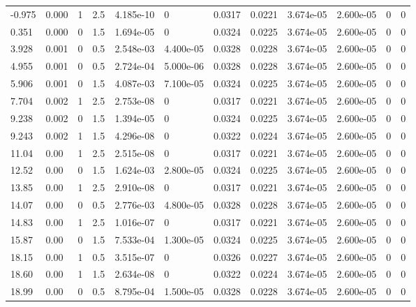 \documentclass[preview]{standalone}
\begin{document}
{{\begin{tabular}{L{1.2cm}C{1.2cm} C{0.3cm}C{0.5cm} C{1.4cm}C{1.4cm} C{1.4cm}C{1.4cm} C{1.6cm}C{1.6cm} C{1.6cm}C{1.6cm}}
  -0.975  &  0.000  & 1     & 2.5 &  4.185e-10  & 0  &  0.0317&   0.0221& 3.674e-05 & 2.600e-05   &  0 & 0  \\ 
  0.351  &  0.000  & 0     & 1.5 &  1.694e-05  & 0  &  0.0324&   0.0225& 3.674e-05 & 2.600e-05   &  0 & 0  \\ 
  3.928  &  0.001  & 0     & 0.5 &  2.548e-03  & 4.400e-05  &  0.0328&   0.0228& 3.674e-05 & 2.600e-05   &  0 & 0  \\ 
  4.955  &  0.001  & 0     & 0.5 &  2.724e-04  & 5.000e-06  &  0.0328&   0.0228& 3.674e-05 & 2.600e-05   &  0 & 0  \\ 
  5.906  &  0.001  & 0     & 1.5 &  4.087e-03  & 7.100e-05  &  0.0324&   0.0225& 3.674e-05 & 2.600e-05   &  0 & 0  \\ 
  7.704  &  0.002  & 1     & 2.5 &  2.753e-08  & 0  &  0.0317&   0.0221& 3.674e-05 & 2.600e-05   &  0 & 0  \\ 
  9.238  &  0.002  & 0     & 1.5 &  1.394e-05  & 0  &  0.0324&   0.0225& 3.674e-05 & 2.600e-05   &  0 & 0  \\ 
  9.243  &  0.002  & 1     & 1.5 &  4.296e-08  & 0  &  0.0322&   0.0224& 3.674e-05 & 2.600e-05   &  0 & 0  \\ 
  11.04  &  0.00  & 1     & 2.5 &  2.515e-08  & 0  &  0.0317&   0.0221& 3.674e-05 & 2.600e-05   &  0 & 0  \\ 
  12.52  &  0.00  & 0     & 1.5 &  1.624e-03  & 2.800e-05  &  0.0324&   0.0225& 3.674e-05 & 2.600e-05   &  0 & 0  \\ 
  13.85  &  0.00  & 1     & 2.5 &  2.910e-08  & 0  &  0.0317&   0.0221& 3.674e-05 & 2.600e-05   &  0 & 0  \\ 
  14.07  &  0.00  & 0     & 0.5 &  2.776e-03  & 4.800e-05  &  0.0328&   0.0228& 3.674e-05 & 2.600e-05   &  0 & 0  \\ 
  14.83  &  0.00  & 1     & 2.5 &  1.016e-07  & 0  &  0.0317&   0.0221& 3.674e-05 & 2.600e-05   &  0 & 0  \\ 
  15.87  &  0.00  & 0     & 1.5 &  7.533e-04  & 1.300e-05  &  0.0324&   0.0225& 3.674e-05 & 2.600e-05   &  0 & 0  \\ 
  18.15  &  0.00  & 1     & 0.5 &  3.515e-07  & 0  &  0.0326&   0.0227& 3.674e-05 & 2.600e-05   &  0 & 0  \\ 
  18.60  &  0.00  & 1     & 1.5 &  2.634e-08  & 0  &  0.0322&   0.0224& 3.674e-05 & 2.600e-05   &  0 & 0  \\ 
  18.99  &  0.00  & 0     & 0.5 &  8.795e-04  & 1.500e-05  &  0.0328&   0.0228& 3.674e-05 & 2.600e-05   &  0 & 0  \\ 

\end{tabular}}}
\end{document}
